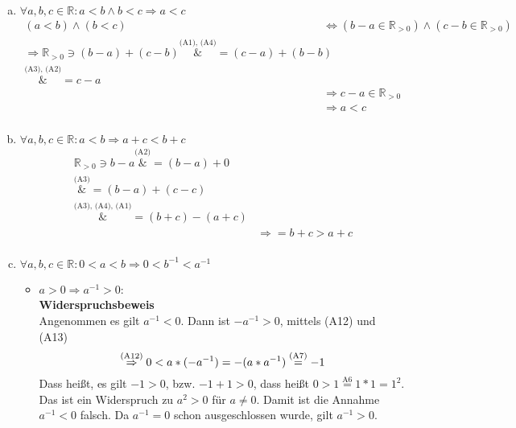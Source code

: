 \documentclass{article}
\begin{document}
\begin{enumerate}[(a)]
\item $\forall a,b,c \in \mathbb{R} \colon a < b \land b < c \Rightarrow a < c$ \\
  \begin{align*}
    (a < b) \land (b < c) &\iff (b - a \in \mathbb{R}_{>0}) \land (c - b \in \mathbb{R}_{>0}) \\
    \Rightarrow \mathbb{R}_{>0} \ni (b - a) + (c - b) \overset{\text{(A1), (A4)}}&{=} (c - a) + (b - b) \\
                                                      \overset{\text{(A3), (A2)}}&{=} c - a \\
                                                      & \Rightarrow c - a \in \mathbb{R}_{>0} \\
                                                      & \Rightarrow a < c\\
  \end{align*}
\item $\forall a,b,c \in \mathbb{R} \colon a < b \Rightarrow a + c < b + c$ \\
  \begin{align*}
    \mathbb{R}_{>0} \ni b - a \overset{\text{(A2)}}&{=} (b - a) + 0 \\
                              \overset{\text{(A3)}}&{=} (b - a) + (c - c) \\ 
                              \overset{\text{(A3), (A4), (A1)}}&{=} (b + c) - (a + c) \\
                              &\Rightarrow= b + c > a + c \\
  \end{align*}
\item $\forall a,b,c \in \mathbb{R} \colon 0 < a < b \Rightarrow 0 < b^{-1} < a^{-1}$ \\
  \begin{itemize}
  \item $a > 0 \Rightarrow a^{-1} > 0$:\\
    \textbf{Widerspruchsbeweis} \\
    Angenommen es gilt $a^{-1} < 0$. Dann ist $-a^{-1} > 0$, mittels (A12) und (A13)
    \[
      \overset{\text{(A12)}}\Rightarrow 0 < a * (-a^{-1}) = -(a * a^{-1}) \overset{\text{(A7)}}= -1 \\
    \]
    Dass heißt, es gilt $-1 > 0$, bzw. $-1 + 1 > 0$, dass heißt $0 > 1 \overset{\text{A6}}= 1 * 1 = 1^2$.
    Das ist ein Widerspruch zu $a^2 > 0$ für $a \ne 0$.
    Damit ist die Annahme $a^{-1} < 0$ falsch. Da $a^{-1} = 0$ schon ausgeschlossen wurde, gilt $a^{-1} > 0$.  

\end{itemize}
\end{enumerate}
\end{document}
